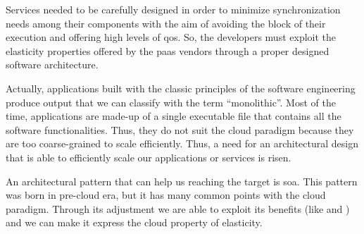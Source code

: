 Services needed to be carefully designed in order to minimize synchronization needs among their components
with the aim of avoiding the block of their execution and offering high levels of \ac{qos}. So, the
developers must exploit the elasticity properties offered by the \ac{paas} vendors through a proper
designed software architecture.

Actually, applications built with the classic principles of the software engineering produce output 
that we can classify with the term ``monolithic''. Most of the time, applications are made-up of a
single executable file that contains all the software functionalities. Thus, they do not suit the cloud
paradigm because they are too coarse-grained to scale efficiently. Thus, a need for an architectural 
design that is able to efficiently scale our applications or services is risen.

An architectural pattern that can help us reaching the target is \acf{soa}. This pattern was born in 
pre-cloud era, but it has many common points with the cloud paradigm. Through its adjustment we are
able to exploit its benefits (like  and ) and we can make
it express the cloud property of elasticity.